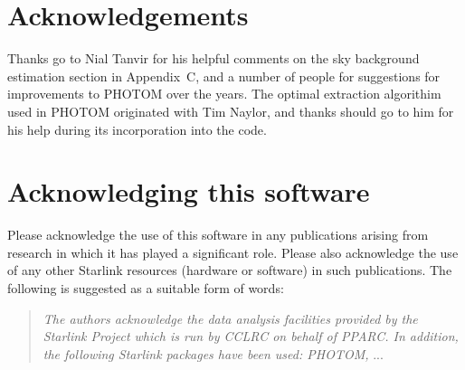 \documentclass[twoside,11pt]{article}
\newcommand{\htmlref}[2]{#1}
\newcommand{\xlabel}[1]{}
\renewcommand{\_}{\texttt{\symbol{95}}}
\begin{document}
\section{\xlabel{acknowledgements}Acknowledgements}

Thanks go to Nial Tanvir for his helpful comments on the sky background
estimation section in Appendix~C, and a number of people for suggestions
for improvements to \htmlref{PHOTOM}{PHOTOM} over the years. The optimal extraction algorithim used in \htmlref{PHOTOM}{PHOTOM} originated with
Tim Naylor, and thanks should go to him for his help during its incorporation
into the code.

\section{Acknowledging this software}
Please acknowledge the use of this software in any publications arising
from research in which it has played a significant role. Please also
acknowledge the use of any other Starlink resources (hardware or
software) in such publications. The following is suggested as a suitable
form of words:

\begin{center}
\begin{quote}
\emph{The authors acknowledge the data analysis facilities provided by
the Starlink Project which is run by CCLRC on behalf of PPARC. In
addition, the following Starlink packages have been used: PHOTOM,} ...
\end{quote}
\end{center}

\newpage
\appendix
\end{document}
